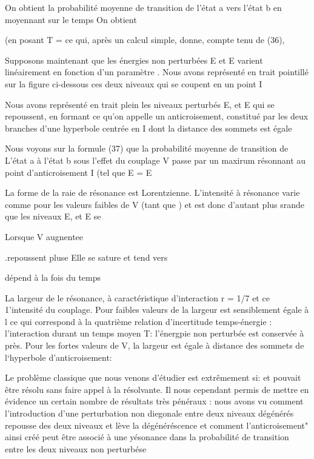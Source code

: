 On obtient la probabilité moyenne de transition de l'état a vers l'état
b en moyennant sur le temps  On obtient

(en posant T =
ce qui, après un calcul simple, donne, compte tenu de (36),

Supposons maintenant que les énergies non perturbées E et E varient linéairement
en fonction d'un paramètre . Nous avons représenté en
trait pointillé sur la figure ci-dessous ces deux niveaux qui se coupent en
un point I

 

 

Nous avons représenté en trait plein les niveaux perturbés E, et E qui
se repoussent, en formant ce qu'on appelle un anticroisement, constitué par les
deux branches d'une hyperbole centrée en I dont la distance des sommets est égale


Nous voyons sur la formule (37) que la probabilité moyenne de transition de L'état a à l'état b sous l'effet du couplage V passe par un maxirum
résonnant au point d'anticroisement I (tel que E = E

La forme de la raie de résonance est Lorentzienne. L'intensité à
résonance varie comme  pour les valeurs faibles de V (tant que
) et est donc d'autant plus srande que les niveaux E, et E se

Lorsque V augnentee

.repoussent pluse Elle se sature et tend vers 


dépend à la fois du temps

La largeur de le résonance, à
caractéristique d'interaction r = 1/7 et ce 1'intensité du couplage. Pour 
faibles valeurs de  la largeur  est sensiblement égale à l
ce qui correspond à la quatrième relation d'incertitude temps-énergie : l'interaction
durant un temps moyen T: l'énergpie non perturbée est conservée à
 près. Pour les fortes valeurs de V, la largeur est égale à 
distance des sommets de l‘hyperbole d'anticroisement:

Le problème classique que nous venons d'étudier est extrêmement si:
et pouvait être résolu sans faire appel à la résolvante. Il nous  cependant permis
de mettre en évidence un certain nombre de résultats très pénéraux : nous
avons vu comment l'introduction d'une perturbation non diegonale entre deux niveaux
dégénérés repousse des deux niveaux et lève la dégénéréscence et comment
l'anticroisement" ainsi créé peut être associé à une yésonance dans la probabilité
de transition entre les deux niveaux non perturbése

